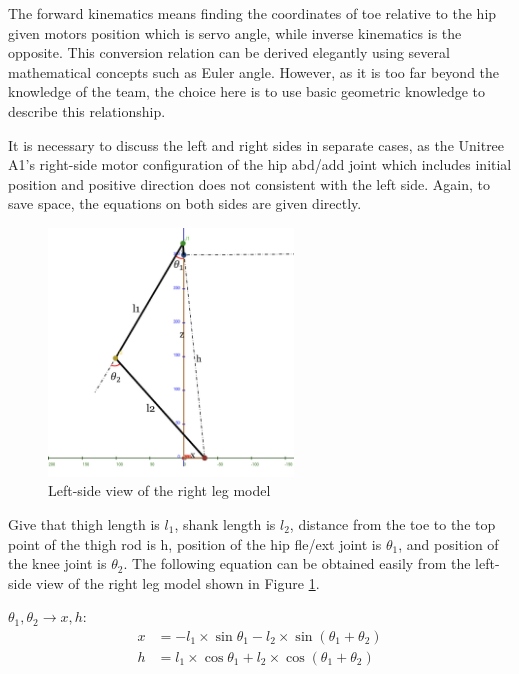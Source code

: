 The forward kinematics means finding the coordinates of toe relative to the hip given motors position which is servo angle, while inverse kinematics is the opposite. This conversion relation can be derived elegantly using several mathematical concepts such as Euler angle. However, as it is too far beyond the knowledge of the team, the choice here is to use basic geometric knowledge to describe this relationship.

It is necessary to discuss the left and right sides in separate cases, as the Unitree A1's right-side motor configuration of the hip abd/add joint which includes initial position and positive direction does not consistent with the left side. Again, to save space, the equations on both sides are given directly.

\begin{figure}[htbp]
   \centering
   \includegraphics[width=0.58\textwidth]{figures/right_leg_model_left-side_view.jpg}
   \caption{Left-side view of the right leg model}
   \label{fig:right_leg_model_left-side_view}
\end{figure}

Give that thigh length is $l_1$, shank length is $l_2$, distance from the toe to the top point of the thigh rod is h, position of the hip fle/ext joint is $\theta_1$, and position of the knee joint is $\theta_2$. The following equation can be obtained easily from the left-side view of the right leg model shown in Figure \ref{fig:right_leg_model_left-side_view}.

$\theta_1, \theta_2 \rightarrow x, h$:
\begin{align*}
x &= -l_1 \times \sin\theta_1 - l_2 \times \sin(\theta_1 + \theta_2) \\
h &=  l_1 \times \cos\theta_1 + l_2 \times \cos(\theta_1 + \theta_2)
\end{align*}

